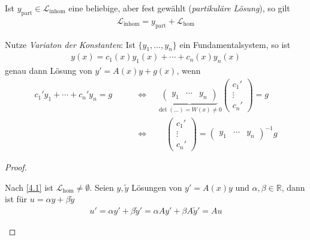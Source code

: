 \begin{theorem}[Satz]
\begin{enum-arab}
\begin{enum-alph}
      Ist $y_{\text{part}} \in \mathcal L_{\text{inhom}}$ eine beliebige, aber fest gewählt (\emph{partikuläre Lösung}), so gilt
      \begin{align*}
        \mathcal L_{\text{inhom}} = y_{\text{part}} + \mathcal L_{\text{hom}}
      \end{align*}
    \item
      Nutze \emph{Variaton der Konstanten}:
      Ist $\{y_1,\dotsc, y_n\}$ ein Fundamentalsystem, so ist
      \begin{align*}
        y(x) = c_1(x) y_1(x) + \dotsb + c_n(x) y_n(x)
      \end{align*}
      genau dann Lösung von $y' = A(x)y + g(x)$, wenn
      \begin{align*}
        c_1'y_1 + \dotsb + c_n'y_n = g
        \qquad &\iff \quad
        \underbrace{\begin{pmatrix}
            y_1 & \cdots & y_n
          \end{pmatrix}}_{\det(\dotsc) = W(x) \neq 0} \begin{pmatrix}
          c_1' \\ \vdots \\ c_n'
        \end{pmatrix} = g \\
        & \iff \qquad \begin{pmatrix}
          c_1' \\ \vdots \\ c_n'
        \end{pmatrix} = \begin{pmatrix}
          y_1 & \cdots & y_n
        \end{pmatrix}^{-1} g
      \end{align*}
    \end{enum-alph}
  \end{enum-arab}
  \begin{proof}
    \begin{enum-arab}
    \item
      \begin{enum-alph}
      \item
        Nach \ref{4.1} ist $\mathcal L_{\text{hom}} \neq \emptyset$.
        Seien $y, \tilde y$ Lösungen von $y' = A(x)y$ und $\alpha, \beta \in \mathbb{R}$, dann ist für $u = \alpha y + \beta \tilde y$
        \begin{align*}
          u' = \alpha y' + \beta \tilde y' = \alpha Ay' + \beta A \tilde y' = Au
        \end{align*}

\end{enum-alph}
\end{enum-arab}
\end{proof}
\end{theorem}
